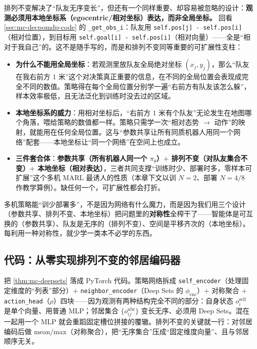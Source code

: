 排列不变解决了“队友无序变长”，但还有一个同样重要、却容易被忽略的设计：\textbf{观测必须用本地坐标系（egocentric/相对坐标）表达，而非全局坐标。} 回看 \cref{sec:mc-decpomdp-code} 的 \verb|_get_obs_i|：队友用 \verb|self.pos[j] - self.pos[i]|（相对位置），到目标用 \verb|self.goal[i] - self.pos[i]|（相对向量）——全是“相对于我自己”的。这不是随手写的，而是和排列不变同等重要的可扩展性支柱：

\begin{itemize}
  \item \textbf{为什么不能用全局坐标}：若观测里放队友全局绝对坐标 $(x_j,y_j)$，那么“队友在我右前方 $1$ 米”这个对决策真正重要的信息，在不同的全局位置会表现成完全不同的数值。策略得在每个全局位置分别学一遍“右前方有队友该怎么躲”，样本效率极低，且无法泛化到训练时没去过的区域。
  \item \textbf{本地坐标系的威力}：用相对坐标后，“右前方 $1$ 米有个队友”无论发生在地图哪个角落，喂给策略的数值都一样。策略只需学一次“相对态势 $\to$ 动作”的映射，就能用在任何全局位置。这与“参数共享让所有同质机器人用同一个网络”配套——本地坐标让“同一个网络”在空间上也成立。
  \item \textbf{三件套合体}：\textbf{参数共享（所有机器人同一个 $\pi_\theta$）$+$ 排列不变（对队友集合不变）$+$ 本地坐标（相对表达）}，三者共同支撑“训练时少、部署时多，零样本可扩展”这个多机 MARL 最诱人的性质（本章下文以训 $N{=}2$、部署 $N{=}4/8$ 作教学算例）。缺任何一个，可扩展性都会打折\cite{an2024perminv}。
\end{itemize}

\begin{insight}
多机策略能“训少部署多”，不是因为网络有什么魔力，而是因为我们用三个设计（参数共享、排列不变、本地坐标）把问题里的\textbf{对称性}全榨干了——智能体是可互换的（参数共享）、队友是无序的（排列不变）、空间是平移齐次的（本地坐标）。每利用一种对称性，就少学一类本不必学的东西。
\end{insight}

\subsection{代码：从零实现排列不变的邻居编码器}
\label{sec:mc-perminv-code}

把 \cref{thm:mc-deepsets} 落成 PyTorch 代码。策略网络拆成 \verb|self_encoder|（处理固定维度的“列表”部分）$+$ \verb|neighbor_encoder|（Deep Sets 的 $\phi_{\mathrm{enc}}$）$+$ 对称聚合 $+$ \verb|action_head|（$\rho$）四块——因为观测有两种结构完全不同的部分：自身状态 $o_i^{\text{self}}$ 是单个向量、用普通 MLP；邻居集合 $\{o_{ij}^{\text{nbr}}\}$ 变长无序、必须用 Deep Sets。混在一起用一个 MLP 就会重蹈固定槽位拼接的覆辙。排列不变的关键就一行：对邻居编码后做 mean/max（对称聚合），把“无序集合”压成“固定维度向量”、且与邻居顺序无关。

